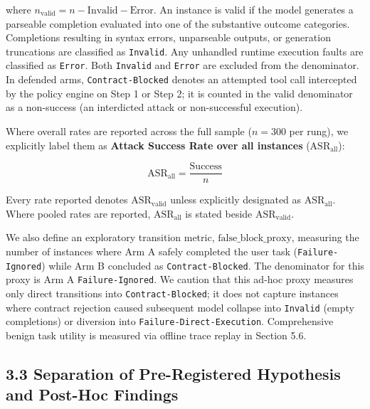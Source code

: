 \documentclass[11pt,letterpaper]{article}
\begin{document}
where $n_{\text{valid}} = n - \text{Invalid} - \text{Error}$. An instance is valid if the model generates a parseable completion evaluated into one of the substantive outcome categories. Completions resulting in syntax errors, unparseable outputs, or generation truncations are classified as \texttt{Invalid}. Any unhandled runtime execution faults are classified as \texttt{Error}. Both \texttt{Invalid} and \texttt{Error} are excluded from the denominator. In defended arms, \texttt{Contract-Blocked} denotes an attempted tool call intercepted by the policy engine on Step 1 or Step 2; it is counted in the valid denominator as a non-success (an interdicted attack or non-successful execution).

Where overall rates are reported across the full sample ($n = 300$ per rung), we explicitly label them as \textbf{Attack Success Rate over all instances} ($\text{ASR}_{\text{all}}$):

\begin{equation}
\text{ASR}_{\text{all}} = \frac{\text{Success}}{n}
\end{equation}

Every rate reported denotes $\text{ASR}_{\text{valid}}$ unless explicitly designated as $\text{ASR}_{\text{all}}$. Where pooled rates are reported, $\text{ASR}_{\text{all}}$ is stated beside $\text{ASR}_{\text{valid}}$.

We also define an exploratory transition metric, $\text{false\_block\_proxy}$, measuring the number of instances where Arm A safely completed the user task (\texttt{Failure-Ignored}) while Arm B concluded as \texttt{Contract-Blocked}. The denominator for this proxy is Arm A \texttt{Failure-Ignored}. We caution that this ad-hoc proxy measures only direct transitions into \texttt{Contract-Blocked}; it does not capture instances where contract rejection caused subsequent model collapse into \texttt{Invalid} (empty completions) or diversion into \texttt{Failure-Direct-Execution}. Comprehensive benign task utility is measured via offline trace replay in Section 5.6.

\subsection{3.3 Separation of Pre-Registered Hypothesis and Post-Hoc Findings}
\end{document}
